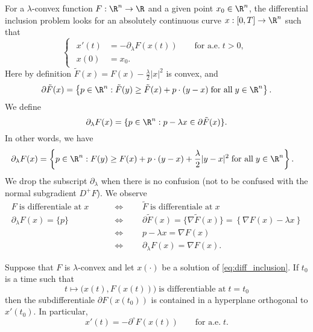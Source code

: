 

For a $\lambda$-convex function $F:\R^n\to \R$ and a given point $x_0\in \R^n$, the differential inclusion problem looks for an absolutely continuous curve $x:[0,T]\to \R^n$ such that
\begin{equation}\label{eq:diff_inclusion}
    \begin{cases}
    \begin{aligned}
        x'(t) &= -\partial_\lambda F(x(t)) \qquad \text{for a.e.}\;t > 0,\\
        x(0)  &= x_0.
    \end{aligned}
    \end{cases}
\end{equation}
Here by definition $\tilde{F}(x) = F(x) - \frac{\lambda}{2}|x|^2$ is convex, and 
\begin{equation*}
    \partial \tilde{F}(x) = \left\lbrace  p\in \R^n: \tilde{F}(y) \geq \tilde{F}(x) + p\cdot (y-x)\;\text{for all}\;y\in \R^n\right\rbrace.
\end{equation*}
We define 
\begin{equation*}
    \partial_\lambda F(x)= \{p\in \R^n: p-\lambda x \in \partial \tilde{F}(x)\}.
\end{equation*}
In other words, we have
\begin{equation*}
\begin{aligned}
    \partial_\lambda F(x) &= \left\lbrace  p\in \R^n: F(y) \geq F(x) + p\cdot (y-x) + \frac{\lambda}{2}|y-x|^2\;\text{for all}\;y\in \R^n\right\rbrace.
    \end{aligned}
\end{equation*}
We drop the subscript $\partial_\lambda$ when there is no confusion (not to be confused with the normal subgradient $D^+F$). We observe
\begin{align*}
    F\;\text{is differentiale at}\;x &\qquad\Longleftrightarrow\qquad \tilde{F}\;\text{is differentiale at}\;x\\
     \partial _\lambda F(x) = \{p\} &\qquad\Longleftrightarrow\qquad   \partial\tilde{F}(x) = \{\nabla \tilde{F}(x)\} = \left\lbrace \nabla F(x) - \lambda x \right\rbrace\\
     &\qquad\Longleftrightarrow\qquad  p - \lambda x = \nabla F(x)\\
     &\qquad\Longleftrightarrow\qquad  \partial_\lambda F(x) = \nabla F(x).
\end{align*}

\begin{thm} Suppose that $F$ is $\lambda$-convex and let $x(\cdot)$ be a solution of \eqref{eq:diff_inclusion}. If $t_0$ is a time such that 
\begin{equation*}
    t\mapsto \big(x(t), F(x(t))\big) \;\text{is differentiable at}\;t=t_0
\end{equation*}
then the subdifferentiale $\partial F(x(t_0))$ is contained in a hyperplane orthogonal to $x'(t_0)$. In particular, 
\begin{equation*}
    x'(t) = -\partial^\circ F(x(t)) \qquad\text{for a.e.}\;t.   
\end{equation*}
\end{thm}

